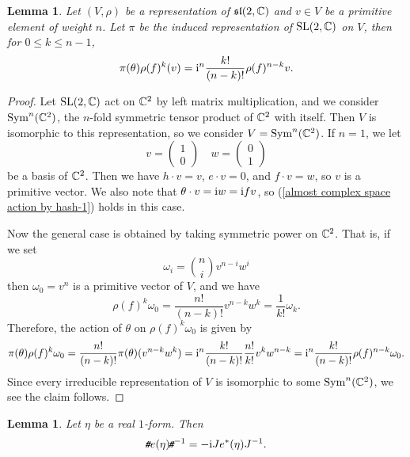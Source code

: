\documentclass[11pt]{book}
\newtheorem{lemma}[theorem]{Lemma}
\theoremstyle{definition}
\begin{document}
\begin{lemma}\label{almost complex space action by hash}
Let $(V,\rho)$ be a representation of $\mathfrak{sl}(2,\mathbb{C})$ and $v\in V$ be a primitive element of weight $n$. Let $\pi$ be the induced representation of $\mathrm{SL}(2,\mathbb{C})$ on $V$, then for $0\leq k\leq n-1$,
\begin{align}\label{almost complex space action by hash-1}
\pi(\theta)\rho(f)^k(v)=\mathrm{i}^n\frac{k!}{(n-k)!}\rho(f)^{n-k}v.
\end{align}
\end{lemma}
\begin{proof}
Let $\mathrm{SL}(2,\mathbb{C})$ act on $\mathbb{C}^2$ by left matrix multiplication, and we consider $\mathrm{Sym}^n(\mathbb{C}^2)$, the $n$-fold symmetric tensor product of $\mathbb{C}^2$ with itself. Then $V$ is isomorphic to this representation, so we consider $V=\mathrm{Sym}^n(\mathbb{C}^2)$. If $n=1$, we let
\[v=\begin{pmatrix}
1\\
0
\end{pmatrix}\quad w=\begin{pmatrix}
0\\
1
\end{pmatrix}\]
be a basis of $\mathbb{C}^2$. Then we have $h\cdot v=v$, $e\cdot v=0$, and $f\cdot v=w$, so $v$ is a primitive vector. We also note that $\theta\cdot v=\mathrm{i} w=\mathrm{i} fv$, so (\ref{almost complex space action by hash-1}) holds in this case.\par
Now the general case is obtained by taking symmetric power on $\mathbb{C}^2$. That is, if we set
\[\omega_i=\binom{n}{i}v^{n-i}w^i\]
then $\omega_0=v^n$ is a primitive vector of $V$, and we have
\[\rho(f)^k\omega_0=\frac{n!}{(n-k)!}v^{n-k}w^k=\frac{1}{k!}\omega_k.\]
Therefore, the action of $\theta$ on $\rho(f)^k\omega_0$ is given by
\[\pi(\theta)\rho(f)^k\omega_0=\frac{n!}{(n-k)!}\pi(\theta)(v^{n-k}w^k)=\mathrm{i}^n\frac{k!}{(n-k)!}\frac{n!}{k!}v^kw^{n-k}=\mathrm{i}^n\frac{k!}{(n-k)!}\rho(f)^{n-k}\omega_0.\]
Since every irreducible representation of $V$ is isomorphic to some $\mathrm{Sym}^n(\mathbb{C}^2)$, we see the claim follows.
\end{proof}
\begin{lemma}\label{almost complex space conjugate by hash}
Let $\eta$ be a real $1$-form. Then
\begin{align}\label{almost complex space conjugate by hash-1}
\!\textit{\texttt{\#}} e(\eta)\!\textit{\texttt{\#}}^{-1}=-\mathrm{i} Je^*(\eta)J^{-1}.
\end{align}
\end{lemma}
\end{document}
